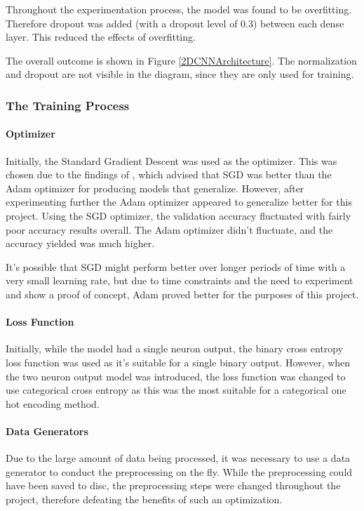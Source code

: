 \documentclass[10pt,a4paper]{article}
\begin{document}
                Throughout the experimentation process, the model was found to be overfitting. Therefore dropout was added (with a dropout level of 0.3) between each dense layer. This reduced the effects of overfitting.

                The overall outcome is shown in Figure \ref{2DCNNArchitecture}. The normalization and dropout are not visible in the diagram, since they are only used for training.


            \subsubsection{The Training Process}
                \paragraph{Optimizer}
                Initially, the Standard Gradient Descent was used as the optimizer. This was chosen due to the findings of \cite{SGDBetterThanAdamForImageClassification},
                which advised that SGD was better than the Adam optimizer for producing models that generalize. However, after experimenting further the Adam optimizer appeared
                to generalize better for this project. Using the SGD optimizer, the validation accuracy fluctuated with fairly poor accuracy results overall. The Adam optimizer
                didn't fluctuate, and the accuracy yielded was much higher.

                It's possible that SGD might perform better over longer periods of time with a very small learning rate, but due to time constraints and the need to experiment and show a proof of concept,
                Adam proved better for the purposes of this project.


                \paragraph{Loss Function}
                    Initially, while the model had a single neuron output, the binary cross entropy loss function was used as it's suitable for a single binary output.
                    However, when the two neuron output model was introduced, the loss function was changed to use categorical cross entropy as this was the most suitable
                    for a categorical one hot encoding method.

                \paragraph{Data Generators}
                    Due to the large amount of data being processed, it was necessary to use a data generator to conduct the preprocessing on the fly. While the preprocessing
                    could have been saved to disc, the preprocessing steps were changed throughout the project, therefore defeating the benefits of such an optimization.
\end{document}
